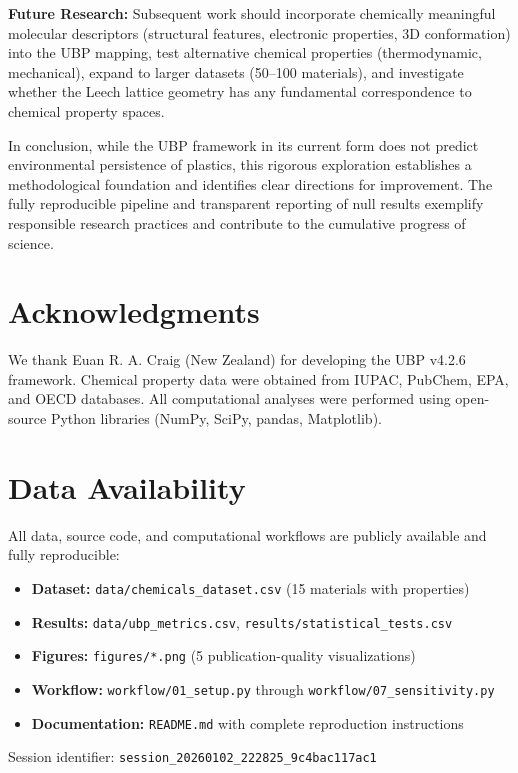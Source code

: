\documentclass[11pt,letterpaper]{article}
\begin{document}
\textbf{Future Research:}
Subsequent work should incorporate chemically meaningful molecular descriptors (structural features, electronic properties, 3D conformation) into the UBP mapping, test alternative chemical properties (thermodynamic, mechanical), expand to larger datasets (50--100 materials), and investigate whether the Leech lattice geometry has any fundamental correspondence to chemical property spaces.

In conclusion, while the UBP framework in its current form does not predict environmental persistence of plastics, this rigorous exploration establishes a methodological foundation and identifies clear directions for improvement. The fully reproducible pipeline and transparent reporting of null results exemplify responsible research practices and contribute to the cumulative progress of science.

\section*{Acknowledgments}

We thank Euan R. A. Craig (New Zealand) for developing the UBP v4.2.6 framework. Chemical property data were obtained from IUPAC, PubChem, EPA, and OECD databases. All computational analyses were performed using open-source Python libraries (NumPy, SciPy, pandas, Matplotlib).

\section*{Data Availability}

All data, source code, and computational workflows are publicly available and fully reproducible:
\begin{itemize}
    \item \textbf{Dataset:} \texttt{data/chemicals\_dataset.csv} (15 materials with properties)
    \item \textbf{Results:} \texttt{data/ubp\_metrics.csv}, \texttt{results/statistical\_tests.csv}
    \item \textbf{Figures:} \texttt{figures/*.png} (5 publication-quality visualizations)
    \item \textbf{Workflow:} \texttt{workflow/01\_setup.py} through \texttt{workflow/07\_sensitivity.py}
    \item \textbf{Documentation:} \texttt{README.md} with complete reproduction instructions
\end{itemize}

Session identifier: \texttt{session\_20260102\_222825\_9c4bac117ac1}



\end{document}

